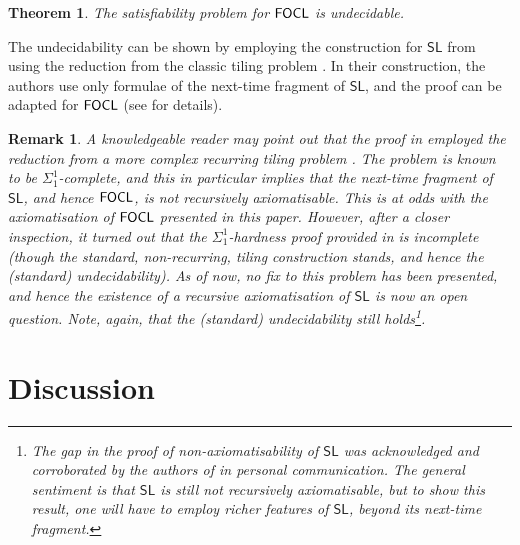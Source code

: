 \documentclass{article}
\newtheorem{theorem}{Theorem}
\newtheorem{remark}{Remark}
\begin{document}

\begin{theorem}
    The satisfiability problem for $\mathsf{FOCL}$ is undecidable.
\end{theorem}

The undecidability can be shown by employing the construction for $\mathsf{SL}$ from \cite{mogavero10,mogavero16} using the reduction from the classic tiling problem \cite{wangTile}. In their construction, the authors use only formulae of  the next-time fragment of $\mathsf{SL}$, and the proof can be adapted for $\mathsf{FOCL}$ (see %
\cite{csl} for details).

\begin{remark}
    A knowledgeable reader may point out that the proof in \cite{mogavero10,mogavero16} employed the reduction from a more complex \emph{recurring tiling problem} \cite{harel83}. The problem is known to be $\Sigma^1_1$-complete, and this in particular implies that the next-time fragment of $\mathsf{SL}$, and hence $\mathsf{FOCL}$, is not recursively axiomatisable. This is at odds with the axiomatisation of $\mathsf{FOCL}$ presented in this paper. However, after a closer inspection, it turned out that the  $\Sigma^1_1$-hardness proof provided in \cite{mogavero10,mogavero16} is incomplete (though the standard, non-recurring, tiling construction stands, and hence the (standard) undecidability). As of now, no fix to this problem has been presented, and hence the existence of a recursive axiomatisation of $\mathsf{SL}$ is now an open question. Note, again, that the (standard) undecidability still holds\footnote{The gap in the proof of non-axiomatisability of $\mathsf{SL}$ was acknowledged and corroborated by the authors of \cite{mogavero10,mogavero16} in personal communication. The general sentiment is that $\mathsf{SL}$ is still not recursively axiomatisable, but to show this result, one will have to employ richer features of $\mathsf{SL}$, beyond its next-time fragment.}. 
\end{remark}     

   

\section{Discussion}
\label{sec:conclusion}
\end{document}
